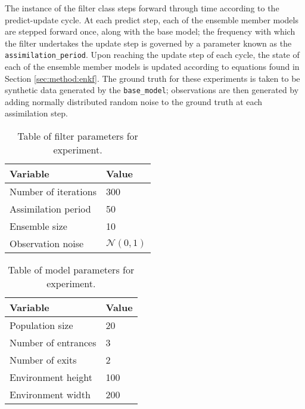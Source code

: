 The instance of the filter class steps forward through time according to the
predict-update cycle.
At each predict step, each of the ensemble member models are stepped forward
once, along with the base model; the frequency with which the filter undertakes
the update step is governed by a parameter known as the
\texttt{assimilation\_period}.
Upon reaching the update step of each cycle, the state of each of the ensemble
member models is updated according to equations found in Section
\ref{sec:method:enkf}.
The ground truth for these experiments is taken to be synthetic data generated
by the \texttt{base\_model}; observations are then generated by adding normally
distributed random noise to the ground truth at each assimilation step.

\begin{table}[h]
    \centering
    \begin{tabular}{@{}ll@{}}
        \toprule
        Variable             & Value  \\ \midrule
        Number of iterations & 300    \\
        Assimilation period  & 50     \\
        Ensemble size        & 10     \\
        Observation noise    & $\mathcal{N}(0,1)$ \\ \bottomrule
    \end{tabular}
    \caption{Table of filter parameters for experiment.}
    \label{tab:filter_params}
\end{table}

\begin{table}[h]
    \centering
    \begin{tabular}{@{}ll@{}}
        \toprule
        Variable            & Value \\ \midrule
        Population size     & 20    \\
        Number of entrances & 3     \\
        Number of exits     & 2     \\
        Environment height  & 100   \\
        Environment width   & 200   \\ \bottomrule
    \end{tabular}
    \caption{Table of model parameters for experiment.}
    \label{tab:model_params}
\end{table}


